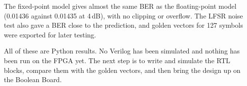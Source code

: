 \documentclass[10pt,twocolumn,letterpaper]{article}
\newcommand{\newend}{\endgroup}
\begin{document}
The fixed-point model gives almost the same BER as the floating-point
model (0.01436 against 0.01435 at 4\,dB), with no clipping or overflow.
The LFSR noise test also gave a BER close to the prediction, and golden
vectors for 127 symbols were exported for later testing.

All of these are Python results. No Verilog has been simulated and
nothing has been run on the FPGA yet. The next step is to write and
simulate the RTL blocks, compare them with the golden vectors, and then
bring the design up on the Boolean Board.
\newend

{\small


}
\end{document}
